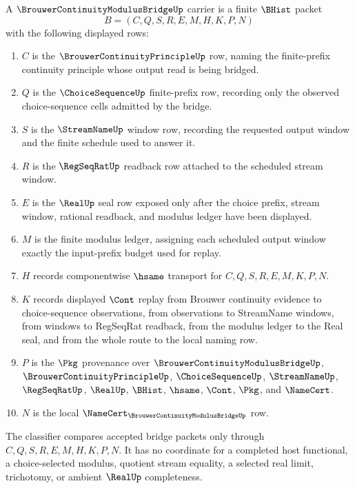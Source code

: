 \begin{definition}
\label{def:brouwer-continuity-modulus-bridge-carrier}
A $\BrouwerContinuityModulusBridgeUp$ carrier is a finite $\BHist$ packet
$$
B=(C,Q,S,R,E,M,H,K,P,N)
$$
with the following displayed rows:
\begin{enumerate}
\item $C$ is the $\BrouwerContinuityPrincipleUp$ row, naming the finite-prefix continuity principle whose output read is being bridged.
\item $Q$ is the $\ChoiceSequenceUp$ finite-prefix row, recording only the observed choice-sequence cells admitted by the bridge.
\item $S$ is the $\StreamNameUp$ window row, recording the requested output window and the finite schedule used to answer it.
\item $R$ is the $\RegSeqRatUp$ readback row attached to the scheduled stream window.
\item $E$ is the $\RealUp$ seal row exposed only after the choice prefix, stream window, rational readback, and modulus ledger have been displayed.
\item $M$ is the finite modulus ledger, assigning each scheduled output window exactly the input-prefix budget used for replay.
\item $H$ records componentwise $\hsame$ transport for $C,Q,S,R,E,M,K,P,N$.
\item $K$ records displayed $\Cont$ replay from Brouwer continuity evidence to choice-sequence observations, from observations to StreamName windows, from windows to RegSeqRat readback, from the modulus ledger to the Real seal, and from the whole route to the local naming row.
\item $P$ is the $\Pkg$ provenance over $\BrouwerContinuityModulusBridgeUp$, $\BrouwerContinuityPrincipleUp$, $\ChoiceSequenceUp$, $\StreamNameUp$, $\RegSeqRatUp$, $\RealUp$, $\BHist$, $\hsame$, $\Cont$, $\Pkg$, and $\NameCert$.
\item $N$ is the local $\NameCert_{\BrouwerContinuityModulusBridgeUp}$ row.
\end{enumerate}
The classifier compares accepted bridge packets only through $C,Q,S,R,E,M,H,K,P,N$. It has no coordinate for a completed host functional, a choice-selected modulus, quotient stream equality, a selected real limit, trichotomy, or ambient $\RealUp$ completeness.
\end{definition}


